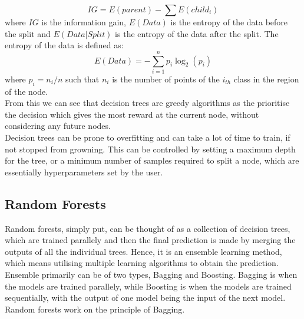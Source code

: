 \documentclass[12pt]{article}
\begin{document}
\begin{equation}
    IG = E(parent) - \sum{E(child_i)}
\end{equation}
where $IG$ is the information gain, $E(Data)$ is the entropy of the data before the split and $E(Data|Split)$ is the entropy of the data after the split. The entropy of the data is defined as:
\begin{equation*}
    E(Data) = -\sum_{i=1}^{n} p_i \log_2(p_i)
\end{equation*}
where $p_i = n_i/n$ such that $n_i$ is the number of points of the $i_{th}$ class in the region of the node.\\
From this we can see that decision trees are greedy algorithms as the prioritise the decision which gives the most reward at the current node, without considering any future nodes.\\
\newline
Decision trees can be prone to overfitting and can take a lot of time to train, if not stopped from growning. This can be controlled by setting a maximum depth for the tree, or a minimum number of samples required to split a node, which are essentially hyperparameters set by the user.\\
\subsection{Random Forests}
Random forests, simply put, can be thought of as a collection of decision trees, which are trained parallely and then the final prediction is made by merging the outputs of all the individual trees. Hence, it is an ensemble learning method, which means utilising multiple learning algorithms to obtain the prediction.\\
Ensemble primarily can be of two types, Bagging and Boosting. Bagging is when the models are trained parallely, while Boosting is when the models are trained sequentially, with the output of one model being the input of the next model. \\
Random forests work on the principle of Bagging.
\end{document}
